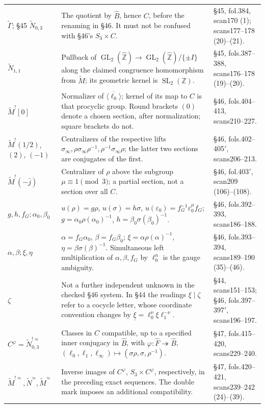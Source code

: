 \begin{longtable}{p{}p{}p{}}
$\widetilde\Gamma$; \S45 $\widetilde N_{0,3}$&The quotient by $\widehat B$, hence $C$, before the renaming in \S46. It must not be confused with \S46's $S_3\times C$.&\S45, fol.384, scan170 (1); scans177--178 (20)--(21).\\
$\widetilde N_{1,1}$&Pullback of $\operatorname{GL}_2(\widehat{\mathbb Z})\to\operatorname{GL}_2(\widehat{\mathbb Z})/\{\pm I\}$ along the claimed congruence homomorphism from $\widetilde M$; its geometric kernel is $\widehat{\operatorname{SL}_2(\mathbb Z)}$.&\S45, fols.387--388, scans176--178 (19)--(20).\\
$\widetilde M^![0]$&Normalizer of $\overline{\langle\ell_0\rangle}$; kernel of its map to $C$ is that procyclic group. Round brackets $(0)$ denote a chosen section, after normalization; square brackets do not.&\S46, fols.404--413, scans210--227.\\
$\widetilde M^!(1/2)$, $(2)$, $(-1)$&Centralizers of the respective lifts $\sigma_\infty,\rho\sigma_\infty\rho^{-1},\rho^{-1}\sigma_\infty\rho$; the latter two sections are conjugates of the first.&\S46, fols.402--405$'$, scans206--213.\\
$\widetilde M^!(-\bar j)$&Centralizer of $\rho$ above the subgroup $\mu\equiv1\pmod3$; a partial section, not a section over all $C$.&\S46, fol.403$'$, scan209 (106)--(108).\\
$g,h,f_G;\alpha_0,\beta_0$&$u(\rho)=g\rho$, $u(\sigma)=h\sigma$, $u(\varepsilon_0)=f_G^{-1}\varepsilon_0^\mu f_G$; $g=\alpha_0\rho(\alpha_0)^{-1}$, $h=\beta_0\sigma(\beta_0)^{-1}$.&\S46, fols.392--393, scans186--188.\\
$\alpha,\beta;\xi,\eta$&$\alpha=f_G\alpha_0$, $\beta=f_G\beta_0$; $\xi=\alpha\rho(\alpha)^{-1}$, $\eta=\beta\sigma(\beta)^{-1}$. Simultaneous left multiplication of $\alpha,\beta,f_G$ by $\ell_0^n$ is the gauge ambiguity.&\S46, fols.393--394, scans189--190 (35)--(46).\\
$\zeta$&Not a further independent unknown in the checked \S46 system. In \S44 the readings $\xi\mid\zeta$ refer to a cocycle letter, whose coordinate convention changes by $\underline\xi=\ell_0^\nu\xi\ell_1^{-\nu}$.&\S44, scans151--153; \S46, fols.397--397$'$, scans196--197.\\
$C^\varphi=\widetilde N_{0,3}^{!\approx}$&Classes in $C$ compatible, up to a specified inner conjugacy in $\widehat B$, with $\varphi:\widehat F\twoheadrightarrow\widehat B$, $(\ell_0,\ell_1,\ell_\infty)\mapsto(\sigma\rho,\sigma,\rho^{-1})$.&\S47, fols.415--420, scans229--240.\\
$\widetilde M^{!\approx},\widetilde N^\approx,\widetilde M^\approx$&Inverse images of $C^\varphi$, $S_3\times C^\varphi$, respectively, in the preceding exact sequences. The double mark imposes an additional compatibility.&\S47, fols.420--421, scans239--242 (24)--(39).\\\bottomrule
\end{longtable}

